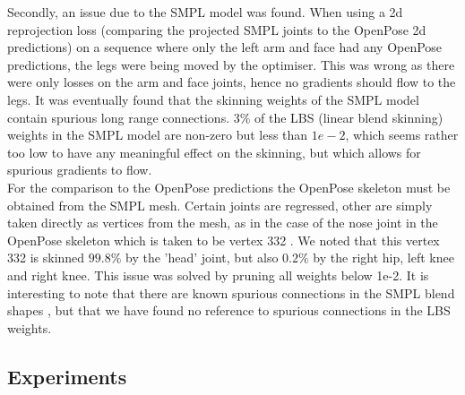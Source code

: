 Secondly, an issue due to the SMPL model was found. When using a 2d reprojection loss (comparing the projected SMPL joints to the OpenPose 2d predictions) on a sequence where only the left arm and face had any OpenPose predictions, the legs were being moved by the optimiser. This was wrong as there were only losses on the arm and face joints, hence no gradients should flow to the legs. It was eventually found that the skinning weights of the SMPL model \cite{SMPL} contain spurious long range connections. 3\% of the LBS (linear blend skinning) weights in the SMPL model are non-zero but less than $1e-2$, which seems rather too low to have any meaningful effect on the skinning, but which allows for spurious gradients to flow. \\
For the comparison to the OpenPose predictions the OpenPose skeleton must be obtained from the SMPL mesh. Certain joints are regressed, other are simply taken directly as vertices from the mesh, as in the case of the nose joint in the OpenPose skeleton which is taken to be vertex 332 \cite{SMPL_op_joints}. We noted that this vertex 332 is skinned $99.8\%$ by the 'head' joint, but also $0.2\%$ by the right hip, left knee and right knee. This issue was solved by pruning all weights below 1e-2. It is interesting to note that there are known spurious connections in the SMPL blend shapes \cite{STAR}, but that we have found no reference to spurious connections in the LBS weights.

\subsection{Experiments}


